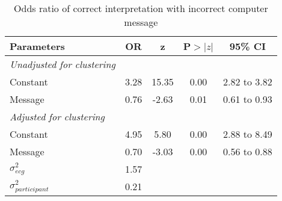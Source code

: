 \begin{table}[htbp]
\centering
\caption{Odds ratio of correct interpretation with incorrect computer message} 
\label{ormesgci}
\begin{tabular}{lcccc}
  \toprule
Parameters & OR & z & P$>$$|z|$ & 95\% CI \\ 
  \midrule
\textit{Unadjusted for clustering}  &  &  &  & \\ 
  Constant & 3.28 & 15.35 & 0.00 & 2.82 to 3.82 \\ 
  Message & 0.76 & -2.63 & 0.01 & 0.61 to 0.93 \\ 
  \midrule
  \textit{Adjusted for clustering} &  &  &  & \\ 
  Constant & 4.95 & 5.80 & 0.00 & 2.88 to 8.49 \\ 
  Message & 0.70 & -3.03 & 0.00 & 0.56 to 0.88 \\ 
  \midrule 
  $\sigma^2_{ecg}$ & 1.57 &  &  &  \\ 
  $\sigma^2_{participant}$ & 0.21 &  &  &  \\ 
   \bottomrule
\end{tabular}
\end{table}

